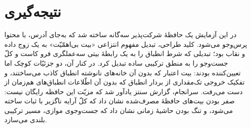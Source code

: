 \documentclass[12pt,a4paper]{article}
\begin{document}
	\section*{نتیجه‌گیری}
	در این آزمایش یک حافظهٔ شرکت‌پذیر سه‌گانه ساخته شد که به‌جای آدرس، با محتوا پرس‌وجو می‌شود. کلید طراحی، تبدیل مفهوم انتزاعی «بیت بی‌اهمّیّت» به یک زوج داده و نقاب بود؛ تبدیلی که شرط انطباق را به یک رابطهٔ بیتی سه‌عملگری فرو کاست و کلّ جست‌وجو را به منطق ترکیبی ساده تبدیل کرد. در کنار آن، دو جزئیّات کوچک اما تعیین‌کننده بودند: بیت اعتبار که بدون آن خانه‌های نانوشته انطباق کاذب می‌ساختند، و تفکیک خروجی تک‌مقداری از بردار انطباق که بدون آن اطّلاعات انطباق‌های هم‌زمان از دست می‌رفت. سرانجام، گزارش سنتز یادآور شد که مزیّت این حافظه رایگان نیست: صفر بودن بیت‌های حافظهٔ مصرف‌شده نشان داد که کلّ آرایه ناگزیر با ثبات ساخته می‌شود، و تنگ بودن حاشیهٔ زمانی نشان داد که جست‌وجوی موازی، مسیر ترکیبی بلندی می‌سازد.
\end{document}
